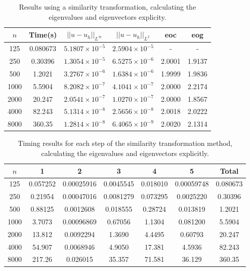 \documentclass{article}
\numberwithin{equation}{section}
\begin{document}
\begin{table}[H]
\centering
\begin{tabular}{|c|c|c|c|c|c|}
\hline
$n$ & Time(s) & $|| u - u_h ||_{L^{\infty}}$ &$|| u - u_h ||_{L^{2}}$ & eoc & eog\\
\hline
125 & 0.080673 & $5.1807 \times 10^{-5}$ & $2.5904 \times 10^{-5}$ & - & -  \\
250 & 0.30396 & $1.3054 \times 10^{-5}$ & $6.5275 \times 10^{-6}$ & 2.0001 & 1.9137  \\
500 & 1.2021 & $3.2767 \times 10^{-6}$ & $1.6384 \times 10^{-6}$ & 1.9999 & 1.9836 \\
1000 & 5.5904 & $8.2082 \times 10^{-7}$ & $4.1041 \times 10^{-7}$ & 2.0000 & 2.2174  \\
2000 & 20.247 & $2.0541 \times 10^{-7}$ & $1.0270 \times 10^{-7}$ & 2.0000 & 1.8567 \\
4000 & 82.243 & $5.1314 \times 10^{-8}$ & $2.5656 \times 10^{-8}$ & 2.0018 & 2.0222  \\
8000 & 360.35 & $1.2814 \times 10^{-8}$ & $6.4065 \times 10^{-9}$ & 2.0020 & 2.1314  \\
\hline
\end{tabular}
\captionsetup{justification=centering}
\caption{Results using a similarity transformation, calculating the eigenvalues and eigenvectors explicity.}
\end{table}

\begin{table}[H]
\centering
\begin{tabular}{|c|c|c|c|c|c|c|}
\hline
$n$ & 1 & 2 & 3 & 4 & 5 & Total \\
\hline
125 & 0.057252 & 0.00025916 & 0.0045545 & 0.018010 & 0.00059748 & 0.080673 \\
250 & 0.21954 & 0.00047016 & 0.0081279 & 0.073295 & 0.0025220 & 0.30396 \\ 
500 & 0.88125 & 0.0012608 & 0.018555 & 0.28724 & 0.013819 & 1.2021  \\
1000 & 3.7073 & 0.00096869 & 0.67056 & 1.1304 & 0.081200 & 5.5904 \\
2000 & 13.812 & 0.0092294 & 1.3690 & 4.4495 & 0.60793 & 20.247 \\
4000 & 54.907 & 0.0068946 & 4.9050 & 17.381 & 4.5936 & 82.243 \\
8000 & 217.26 & 0.026015 & 35.357 & 71.581 & 36.129 & 360.35 \\
\hline
\end{tabular}
\captionsetup{justification=centering}
\caption{Timing results for each step of the similarity transformation method, calculating the eigenvalues and eigenvectors explicitly.}
\end{table}
\end{document}
